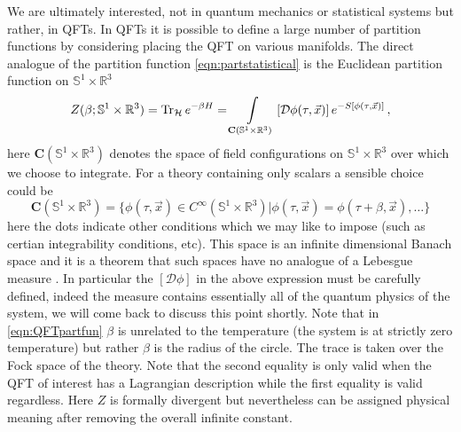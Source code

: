 \documentclass[main.tex]{subfiles}
\begin{document}
We are ultimately interested, not in quantum mechanics or statistical systems but rather, in QFTs.  In QFTs it is possible to define a large number of partition functions by considering placing the QFT on various manifolds.  The direct analogue of the partition function \eqref{eqn:partstatistical} is the Euclidean partition function on $\mathbb{S}^1\times\mathbb{R}^3$
\begin{equation}\label{eqn:QFTpartfun}
Z(\beta;\mathbb{S}^1\times\mathbb{R}^3)=\operatorname{Tr}_{\mathcal{H}}e^{-\beta H}=\int\displaylimits_{\mathbf{C}(\mathbb{S}^1\times\mathbb{R}^3)}\left[\mathcal{D}\phi(\tau,\vec{x})\right]e^{-S[\phi(\tau,\vec{x})]}\,,
\end{equation}
here $\mathbf{C}(\mathbb{S}^1\times\mathbb{R}^3)$ denotes the space of field configurations on $\mathbb{S}^1\times\mathbb{R}^3$ over which we choose to integrate.  For a theory containing only scalars a sensible choice could be
\begin{equation}
\mathbf{C}(\mathbb{S}^1\times\mathbb{R}^3)=\{\phi(\tau,\vec{x})\in C^{\infty}(\mathbb{S}^1\times\mathbb{R}^3)|\phi(\tau,\vec{x})=\phi(\tau+\beta,\vec{x}),\dots\}
\end{equation}
here the dots indicate other conditions which we may like to impose (such as certian integrability conditions, etc).  This space is an infinite dimensional Banach space and it is a theorem that such spaces have no analogue of a Lebesgue measure \cite{oxtoby1978,hunt1992prevalence}.  In particular the $[\mathcal{D}\phi]$ in the above expression must be carefully defined, indeed the measure contains essentially all of the quantum physics of the system, we will come back to discuss this point shortly.  
Note that in \eqref{eqn:QFTpartfun} $\beta$ is unrelated to the temperature (the system is at strictly zero temperature) but rather $\beta$ is the radius of the circle.  The trace is taken over the Fock space of the theory.  Note that the second equality is only valid when the QFT of interest has a Lagrangian description while the first equality is valid regardless.  Here $Z$ is formally divergent but nevertheless can be assigned physical meaning after removing the overall infinite constant.  
\end{document}
